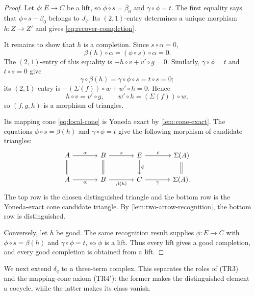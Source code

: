 \documentclass[a4paper,11pt,reqno]{amsart}
\theoremstyle{definition}
\theoremstyle{plain}
\numberwithin{equation}{section}
\begin{document}
\begin{proof}
Let $\phi:E\to C$ be a lift, so
$\overline{\phi\circ s}=\bar\beta_0$ and $\gamma\circ\phi=t$.  The first equality says
that $\phi\circ s-\beta_0$ belongs to $J_q$.  Its $(2,1)$-entry determines
a unique morphism $h:Z\to Z'$ and gives \eqref{eq:recover-completion}.

It remains to show that $h$ is a completion.  Since $s\circ\alpha=0$,
\[
 \beta(h)\circ\alpha=(\phi\circ s)\circ\alpha=0.
\]
The $(2,1)$-entry of this equality is
$-h\circ v+v'\circ g=0$.  Similarly, $\gamma\circ\phi=t$ and $t\circ s=0$ give
\[
 \gamma\circ\beta(h)=\gamma\circ\phi\circ s=t\circ s=0;
\]
its $(2,1)$-entry is $-(\Sigma(f))\circ w+w'\circ h=0$.  Hence
\[
 h\circ v=v'\circ g,\qquad w'\circ h=(\Sigma(f))\circ w,
\]
so $(f,g,h)$ is a morphism of triangles.

Its mapping cone \eqref{eq:local-cone} is Yoneda exact by
\cref{lem:cone-exact}.  The equations
$\phi\circ s=\beta(h)$ and $\gamma\circ\phi=t$ give the following morphism
of candidate triangles:
\[
\begin{tikzcd}[column sep=large]
A \arrow[r,"\alpha"] \arrow[d,equal]
  & B \arrow[r,"s"] \arrow[d,equal]
  & E \arrow[r,"t"] \arrow[d,"\phi"]
  & \Sigma(A) \arrow[d,equal]\\
A \arrow[r,"\alpha"']
  & B \arrow[r,"\beta(h)"']
  & C \arrow[r,"\gamma"']
  & \Sigma(A).
\end{tikzcd}
\]
The top row is the chosen distinguished triangle and the bottom row is the
Yoneda-exact cone candidate triangle.  By \cref{lem:two-arrow-recognition}, the
bottom row is distinguished.

Conversely, let $h$ be good.  The same recognition result supplies
$\phi:E\to C$ with $\phi\circ s=\beta(h)$ and $\gamma\circ\phi=t$, so
$\phi$ is a lift.  Thus every lift gives a good completion, and every good
completion is obtained from a lift.
\end{proof}

We next extend $\delta_q$ to a three-term complex.  This separates the roles
of \textup{(TR3)} and the mapping-cone axiom \textup{(TR4$'$)}: the former
makes the distinguished element a cocycle, while the latter makes its class
vanish.
\end{document}
